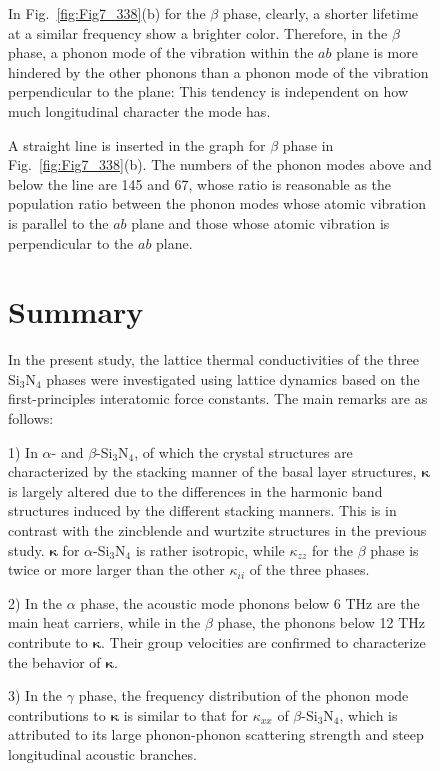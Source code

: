 \documentclass[twocolumn,amsmath,amssymb,a4paper,prb,superscriptaddress,floatfix]{revtex4-1}
\begin{document}
\begin{figure}[h]
In Fig.~\ref{fig:Fig7_338}(b) for the $\beta$ phase, clearly, a shorter
lifetime at a similar frequency show a brighter color. 
Therefore, in the $\beta$
phase,  a phonon mode of the vibration within the $ab$ plane is more hindered by
the other phonons than a phonon mode of the vibration 
perpendicular to the plane: This tendency is independent on how much
longitudinal character the mode has.

A straight line is inserted in the graph for $\beta$ phase in
Fig.~\ref{fig:Fig7_338}(b).
The numbers of the phonon modes above and
below the line are 145 and 67, whose ratio is reasonable as the population ratio
between the phonon modes whose atomic vibration is parallel to the $ab$ plane
and those whose atomic vibration is perpendicular to the $ab$ plane.


\section{Summary}

In the present study, the lattice thermal conductivities of the
three Si$_3$N$_4$ phases were investigated using lattice dynamics based on the
first-principles interatomic force constants. The main remarks are as follows:

1) In $\alpha$- and $\beta$-Si$_3$N$_4$, of which the crystal structures are
characterized by the stacking manner of the basal layer structures,
$\boldsymbol{\kappa}$ is largely altered due to the differences in the harmonic
band structures induced by the different stacking manners. This is in contrast
with the zincblende and wurtzite structures in the previous
study\cite{phono3py}. $\boldsymbol{\kappa}$ for $\alpha$-Si$_3$N$_4$ is rather
isotropic, while $\kappa$$_{zz}$ for the $\beta$ phase is twice or more larger
than the other $\kappa_{ii}$ of the three phases.

2) In the $\alpha$ phase, the acoustic mode phonons below 6 THz are the main
heat carriers, while in the $\beta$ phase, the phonons below 12 THz contribute
to $\boldsymbol{\kappa}$. Their group velocities are confirmed to characterize
the behavior of $\boldsymbol{\kappa}$.

3) In the $\gamma$ phase, the frequency distribution of the phonon mode
contributions to $\boldsymbol{\kappa}$ is similar to that for $\kappa_{xx}$ of
$\beta$-Si$_3$N$_4$, which is attributed to its large phonon-phonon scattering
strength and steep longitudinal acoustic branches.




\end{figure}
\end{document}
